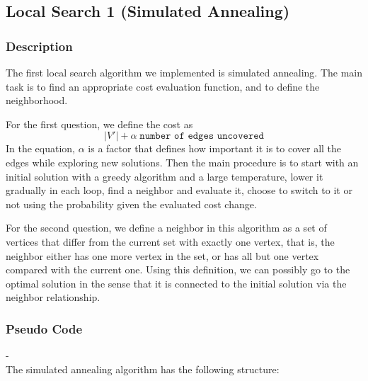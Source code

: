 \documentclass[acmlarge]{acmart}
\begin{document}
\subsection{Local Search 1 (Simulated Annealing)}

\subsubsection{Description}

The first local search algorithm we implemented is simulated annealing. The main task is to find an appropriate cost evaluation function, and to define the neighborhood.

For the first question, we define the cost as $$|V'|+\alpha\; \texttt{number of edges uncovered}$$ 
In the equation, $\alpha$ is a factor that defines how important it is to cover all the edges while exploring new solutions. Then the main procedure is to start with an initial solution with a greedy algorithm and a large temperature, lower it gradually in each loop, find a neighbor and evaluate it, choose to switch to it or not using the probability given the evaluated cost change.

For the second question, we define a neighbor in this algorithm as a set of vertices that differ from the current set with exactly one vertex, that is, the neighbor either has one more vertex in the set, or has all but one vertex compared with the current one. Using this definition, we can possibly go to the optimal solution in the sense that it is connected to the initial solution via the neighbor relationship.

\subsubsection{Pseudo Code}

-\\

The simulated annealing algorithm has the following structure:\\
\end{document}
